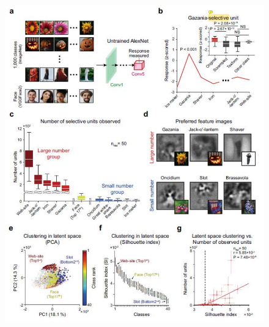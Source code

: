 \documentclass[sn-mathphys]{sn-jnl}%
\theoremstyle{thmstyleone}%
\theoremstyle{thmstyletwo}%
\theoremstyle{thmstylethree}%
\begin{document}
\begin{figure}[htbp]
	\centering
	
	\subfigure%
	{
		\begin{minipage}[t]{1.0\linewidth}
			\centering
			\includegraphics[width=1.0\textwidth]{figs/fig_5_a-f_1.pdf}
		\end{minipage}%
	}%
	

\end{figure}
\end{document}
